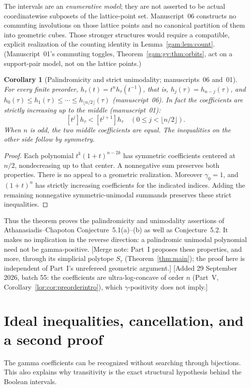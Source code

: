 \documentclass[11pt]{article}
\numberwithin{equation}{section}
\newtheorem{corollary}[theorem]{Corollary}
\theoremstyle{definition}
\begin{document}
The intervals are an \emph{enumerative model}; they are not asserted to be
actual coordinatewise subposets of the lattice-point set. Manuscript~06
constructs no commuting involutions on those lattice points and no canonical
partition of them into geometric cubes. Those stronger structures would
require a compatible, explicit realization of the counting identity in
Lemma~\ref{gam:lem:count}. (Manuscript~01's commuting toggles,
Theorem~\ref{gam:gv:thm:orbits}, act on a support-pair model, not on the
lattice points.)

\begin{corollary}[Palindromicity and strict unimodality; manuscripts~06 and~01]\label{gam:cor:unimodal}
For every finite preorder, $h_\tau(t)=t^nh_\tau(t^{-1})$, that is,
$h_j(\tau)=h_{n-j}(\tau)$, and
$h_0(\tau)\le h_1(\tau)\le\cdots\le h_{\lfloor n/2\rfloor}(\tau)$ (manuscript~06).
In fact the coefficients are strictly increasing up to the middle
(manuscript~01):
\[
 [t^j]h_\tau<[t^{j+1}]h_\tau
                 \quad(0\le j<\lfloor n/2\rfloor).
\]
When $n$ is odd, the two middle coefficients are equal. The inequalities on
the other side follow by symmetry.
\end{corollary}
\begin{proof}
Each polynomial $t^k(1+t)^{n-2k}$ has symmetric coefficients centered at
$n/2$, nondecreasing up to that center. A nonnegative sum preserves both
properties. There is no appeal to a geometric realization. Moreover
$\gamma_0=1$, and $(1+t)^n$ has strictly increasing coefficients for the
indicated indices. Adding the remaining nonnegative symmetric-unimodal
summands preserves these strict inequalities.
\end{proof}
Thus the theorem proves the palindromicity and unimodality assertions of
Athanasiadis--Chapoton Conjecture~5.1(a)--(b) as well as Conjecture~5.2.
It makes no implication in the reverse direction: a palindromic unimodal
polynomial need not be gamma-positive. [Merge note: Part~I proposes these
properties, and more, through its simplicial polytope $S_\tau$
(Theorem~\ref{thm:main}); the proof here is independent of Part~I's
unrefereed geometric argument.]
[Added 29 September 2026, batch 55: the coefficients are
ultra-log-concave of order $n$ (Part~V, Corollary~\ref{lor:cor:preorderintro}),
which $\gamma$-positivity does not imply.]

\section{Ideal inequalities, cancellation, and a second proof}\label{gam:sec:cancel}
The gamma coefficients can be recognized without searching through
bijections. This also explains why transitivity is the exact structural
hypothesis behind the Boolean intervals.
\end{document}
